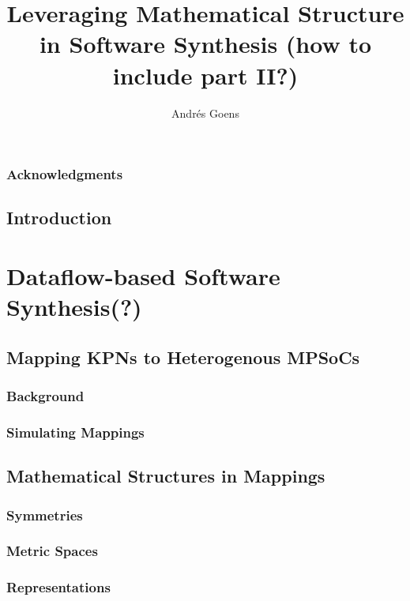 \documentclass{report}
\title{Leveraging Mathematical Structure in Software Synthesis (how to include part II?)}
\author{Andr\'{e}s Goens}
\begin{document}
\date{}

\maketitle
\tableofcontents
\clearpage
\section*{Acknowledgments}


\chapter{Introduction}


\part{Dataflow-based Software Synthesis(?)}

\chapter{Mapping KPNs to Heterogenous MPSoCs}

\section{Background}

\section{Simulating Mappings}


\chapter{Mathematical Structures in Mappings}

\section{Symmetries}
\section{Metric Spaces}
\section{Representations}
%
\end{document}
